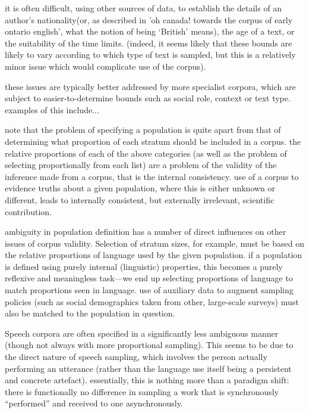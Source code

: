 it is often difficult, using other sources of data, to establish the details of an author's nationality(or, as described in 'oh canada! towards the corpus of early ontario english', what the notion of being `British' means), the age of a text, or the suitability of the time limits.  (indeed, it seems likely that these bounds are likely to vary according to which type of text is sampled, but this is a relatively minor issue which would complicate use of the corpus).

these issues are typically better addressed by more specialist corpora, which are subject to easier-to-determine bounds such as social role, context or text type.  examples of this include...


note that the problem of specifying a population is quite apart from that of determining what proportion of each stratum should be included in a corpus.  the relative proportions of each of the above categories (as well as the problem of selecting proportionally from each list) are a problem of the validity of the inference made from a corpus, that is the internal consistency.  use of a corpus to evidence truths about a given population, where this is either unknown or different, leads to internally consistent, but externally irrelevant, scientific contribution.

ambiguity in population definition has a number of direct influences on other issues of corpus validity. Selection of stratum sizes, for example, must be based on the relative proportions of language used by the given population. if a population is defined using purely internal (linguistic) properties, this becomes a purely reflexive and meaningless task---we end up selecting proportions of language to match proportions seen in language.  use of auxiliary data to augment sampling policies (such as social demographics taken from other, large-scale surveys) must also be matched to the population in question.


Speech corpora are often specified in a significantly less ambiguous manner (though not always with more proportional sampling). This seems to be due to the direct nature of speech sampling, which involves the person actually performing an utterance (rather than the language use itself being a persistent and concrete artefact).  essentially, this is nothing more than a paradigm shift: there is functionally no difference in sampling a work that is synchronously ``performed'' and received to one asynchronously.

